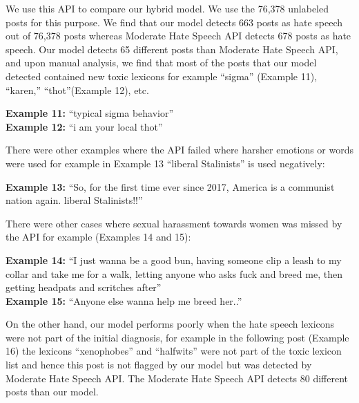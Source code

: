 We use this API to compare our hybrid model.
We use the 76,378 unlabeled posts for this purpose.
We find that our model detects 663 posts as hate speech out of 76,378 posts whereas Moderate Hate Speech API detects 678 posts as hate speech. Our model detects 65 different posts than Moderate Hate Speech API, and upon manual analysis, we find that most of the posts that our model detected contained new toxic lexicons for example ``sigma'' (Example 11), ``karen,'' ``thot''(Example 12),  etc.

\vspace{0.1in}
\begin{graybox}
\textbf{Example 11: }``typical sigma behavior''\\
\textbf{Example 12: }``i am your local thot''
\end{graybox}
\vspace{0.1in}

There were other examples where the API failed where harsher emotions or words were used for example in Example 13 ``liberal Stalinists'' is used negatively:

\vspace{0.1in}
\begin{graybox}
\textbf{Example 13: }``So, for the first time ever since 2017, America is a communist nation again. liberal Stalinists!!''
\end{graybox}
\vspace{0.1in}

There were other cases where sexual harassment towards women was missed by the API for example (Examples 14 and 15):

\vspace{0.1in}
\begin{graybox}
\textbf{Example 14: }``I just wanna be a good bun, having someone clip a leash to my collar and take me for a walk, letting anyone who asks fuck and breed me, then getting headpats and scritches after''\\
\textbf{Example 15: }``Anyone else wanna help me breed her..''
\end{graybox}
\vspace{0.1in}

On the other hand, our model performs poorly when the hate speech lexicons were not part of the initial diagnosis, for example in the following post (Example 16) the lexicons ``xenophobes'' and ``halfwits'' were not part of the toxic lexicon list and hence this post is not flagged by our model but was detected by Moderate Hate Speech API.
The Moderate Hate Speech API detects 80 different posts than our model. 

